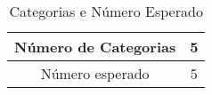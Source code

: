 \begin{table}[htpb]
\begin{center}
\begin{tabular}{cc}
\toprule
Número de Categorias & 5 \\ \midrule
Número esperado      & 5 \\ \midrule 
\end{tabular}
\end{center}
\caption{Categorias e Número Esperado}
\label{tab:tabela2}
\end{table}

